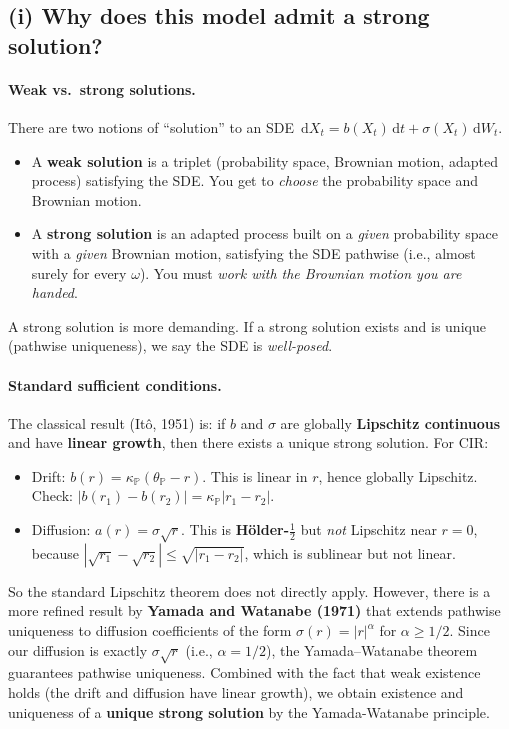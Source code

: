 \documentclass[11pt]{article}
\newcommand{\PP}{\mathbb{P}}
\newcommand{\dd}{\,\mathrm{d}}
\begin{document}
\subsection{(i) Why does this model admit a strong solution?}

\paragraph{Weak vs.\ strong solutions.}  There are two notions of
``solution'' to an SDE $\dd X_t = b(X_t)\dd t + \sigma(X_t)\dd W_t$.
\begin{itemize}
  \item A \textbf{weak solution} is a triplet (probability space, Brownian
  motion, adapted process) satisfying the SDE.  You get to \emph{choose}
  the probability space and Brownian motion.
  \item A \textbf{strong solution} is an adapted process built on a
  \emph{given} probability space with a \emph{given} Brownian motion,
  satisfying the SDE pathwise (i.e., almost surely for every $\omega$).
  You must \emph{work with the Brownian motion you are handed}.
\end{itemize}
A strong solution is more demanding.  If a strong solution exists and is
unique (pathwise uniqueness), we say the SDE is \emph{well-posed}.

\paragraph{Standard sufficient conditions.} The classical result
(It\^{o}, 1951) is: if $b$ and $\sigma$ are globally \textbf{Lipschitz
continuous} and have \textbf{linear growth}, then there exists a unique
strong solution.  For CIR:
\begin{itemize}
  \item Drift: $b(r) = \kappa_\PP(\theta_\PP - r)$.  This is linear in $r$,
  hence globally Lipschitz.  Check: $|b(r_1)-b(r_2)| = \kappa_\PP|r_1-r_2|$.
  \item Diffusion: $a(r) = \sigma\sqrt{r}$.  This is \textbf{H\"older-}$\tfrac{1}{2}$
  but \emph{not} Lipschitz near $r=0$, because
  $|\sqrt{r_1}-\sqrt{r_2}| \le \sqrt{|r_1-r_2|}$, which is
  sublinear but not linear.
\end{itemize}
So the standard Lipschitz theorem does not directly apply.  However, there
is a more refined result by \textbf{Yamada and Watanabe (1971)} that extends
pathwise uniqueness to diffusion coefficients of the form $\sigma(r) = |r|^\alpha$
for $\alpha \ge 1/2$.  Since our diffusion is exactly $\sigma\sqrt{r}$
(i.e., $\alpha = 1/2$), the Yamada--Watanabe theorem guarantees pathwise
uniqueness.  Combined with the fact that weak existence holds (the drift
and diffusion have linear growth), we obtain existence and uniqueness of a
\textbf{unique strong solution} by the Yamada-Watanabe principle.
\end{document}

